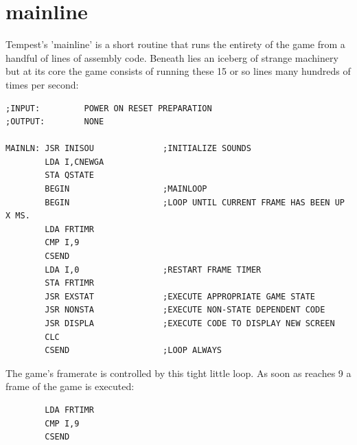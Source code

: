 \chapter{mainline}
\label{sec:listing}
\lstset{style=6502Style}
\lhead[tempest]{}

Tempest's 'mainline' is a short routine that runs the entirety of the game from a handful of lines
of assembly code. Beneath lies an iceberg of strange machinery but at its core the game consists of
running these 15 or so lines many hundreds of times per second:

\begin{lstlisting}
;INPUT:         POWER ON RESET PREPARATION
;OUTPUT:        NONE

MAINLN: JSR INISOU              ;INITIALIZE SOUNDS
        LDA I,CNEWGA
        STA QSTATE
        BEGIN                   ;MAINLOOP
        BEGIN                   ;LOOP UNTIL CURRENT FRAME HAS BEEN UP X MS.
        LDA FRTIMR
        CMP I,9
        CSEND
        LDA I,0                 ;RESTART FRAME TIMER
        STA FRTIMR
        JSR EXSTAT              ;EXECUTE APPROPRIATE GAME STATE
        JSR NONSTA              ;EXECUTE NON-STATE DEPENDENT CODE
        JSR DISPLA              ;EXECUTE CODE TO DISPLAY NEW SCREEN
        CLC
        CSEND                   ;LOOP ALWAYS
\end{lstlisting}

The game's framerate is controlled by this tight little loop. As soon as  reaches 9 a frame
of the game is executed:
\begin{lstlisting}
        LDA FRTIMR
        CMP I,9
        CSEND
\end{lstlisting}
\begin{figure}[H]
  \centering
\end{figure}
\clearpage

